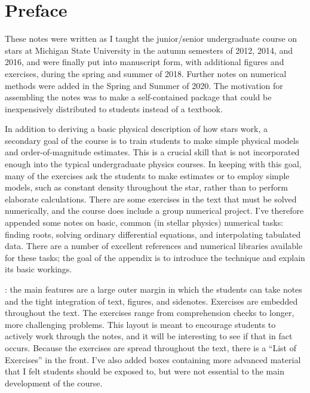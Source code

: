 
\section*{Preface}
These notes were written as I taught the junior/senior undergraduate course on stars at Michigan State University in the autumn semesters of 2012, 2014, and 2016, and were finally put into manuscript form, with additional figures and exercises, during the spring and summer of 2018. Further notes on numerical methods were added in the Spring and Summer of 2020. The motivation for assembling the notes was to make a self-contained package that could be inexpensively distributed to students instead of a textbook.

In addition to deriving a basic physical description of how stars work, a secondary goal of the course is to train students to make simple physical models and order-of-magnitude estimates. This is a crucial skill that is not incorporated enough into the typical undergraduate physics courses. In keeping with this goal, many of the exercises ask the students to make estimates or to employ simple models, such as constant density throughout the star, rather than to perform elaborate calculations. There are some exercises in the text that must be solved numerically, and the course does include a group numerical project. I've therefore appended some notes on basic, common (in stellar physics) numerical tasks: finding roots, solving ordinary differential equations, and interpolating tabulated data. There are a number of excellent references and numerical libraries available for these tasks; the goal of the appendix is to introduce the technique and explain its basic workings.

: the main features are a large outer margin in which the students can take notes and the tight integration of text, figures, and sidenotes. Exercises are embedded throughout the text. The exercises range from comprehension checks to longer, more challenging problems. This layout is meant to encourage students to actively work through the notes, and it will be interesting to see if that in fact occurs. Because the exercises are spread throughout the text, there is a ``List of Exercises'' in the front. I've also added boxes containing more advanced material that I felt students should be exposed to, but were not essential to the main development of the course. 

